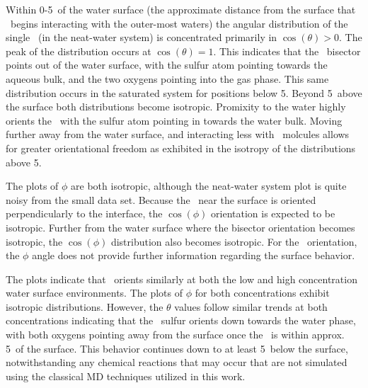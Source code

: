 Within 0-5\angs~of the water surface (the approximate distance from the surface that \suldiox~begins interacting with the outer-most waters) the angular distribution of the single \suldiox~(in the neat-water system) is concentrated primarily in $\cos(\theta)>0$. The peak of the distribution occurs at $\cos(\theta)=1$. This indicates that the \suldiox~bisector points out of the water surface, with the sulfur atom pointing towards the aqueous bulk, and the two oxygens pointing into the gas phase. This same distribution occurs in the saturated system for positions below 5\angs. Beyond 5\angs~above the surface both distributions become isotropic. Promixity to the water highly orients the \suldiox~with the sulfur atom pointing in towards the water bulk. Moving further away from the water surface, and interacting less with \wat~molcules allows for greater orientational freedom as exhibited in the isotropy of the distributions above 5\angs. %

The plots of $\phi$ are both isotropic, although the neat-water system plot is quite noisy from the small data set. Because the \suldiox~near the surface is oriented perpendicularly to the interface, the $\cos(\phi)$ orientation is expected to be isotropic. Further from the water surface where the bisector orientation becomes isotropic, the $\cos(\phi)$ distribution also becomes isotropic. For the \suldiox~orientation, the $\phi$ angle does not provide further information regarding the surface behavior.

The plots indicate that \suldiox~orients similarly at both the low and high concentration water surface environments. The plots of $\phi$ for both concentrations exhibit isotropic distributions. However, the $\theta$ values follow similar trends at both concentrations indicating that the \suldiox~sulfur orients down towards the water phase, with both oxygens pointing away from the surface once the \suldiox~is within approx. 5\angs~of the surface. This behavior continues down to at least 5\angs~below the surface, notwithstanding any chemical reactions that may occur that are not simulated using the classical MD techniques utilized in this work.


